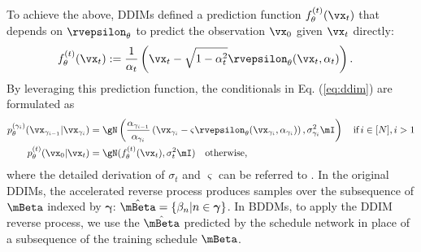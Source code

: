 To achieve the above, DDIMs defined a prediction function $f_{\theta}^{(t)}(\vx_t)$ that depends on $\rvepsilon_{\theta}$ to predict the observation $\vx_0$ given $\vx_t$ directly:
\begin{align}
\label{eq:pf}
    f_{\theta}^{(t)}(\vx_t)&:=\frac{1}{\alpha_t}\left(\vx_t-\sqrt{1-\alpha_t^2}\rvepsilon_{\theta}(\vx_t,\alpha_t)\right).
\end{align}
By leveraging this prediction function, the conditionals in Eq. (\ref{eq:ddim}) are formulated as
\begin{align}
\label{eq:ddimreverse}
    p_\theta^{(\gamma_i)}(\vx_{\gamma_{i-1}}|\vx_{\gamma_i}) 
    &=
     \gN
    \left(
    \frac{\alpha_{\gamma_{i-1}}}{\alpha_{\gamma_{i}}}
    \left(
    \vx_{\gamma_i}-
    \varsigma
    \rvepsilon_{\theta}(\vx_{\gamma_i},\alpha_{\gamma_i})
    \right),\sigma_{\gamma_i}^2\mI
    \right)\quad \text{if }\! i\in[N], i>1\\
\label{eq:ddimreverse2}
    p_\theta^{(t)}(\vx_0|\vx_t)
    &=\gN(f_{\theta}^{(t)}(\vx_t),\sigma_t^2\mI)\quad \text{otherwise,}
\end{align}
where the detailed derivation of $\sigma_t$ and $\varsigma$ can be referred to \citep{jiaming2021}. In the original DDIMs, the accelerated reverse process produces samples over the subsequence of $\mBeta$ indexed by ${\boldsymbol\gamma}$: $\hat{\mBeta}=\{\beta_n|n\in{\boldsymbol\gamma}\}$. In BDDMs, to apply the DDIM reverse process, we use the $\hat{\mBeta}$ predicted by the schedule network in place of a subsequence of the training schedule $\mBeta$.

